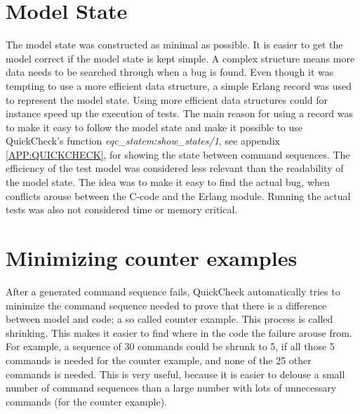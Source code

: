 \section{Model State}
The model state was constructed as minimal as possible. It is easier
to get the model correct if the model state is kept simple. A complex
structure means more data needs to be searched through when a bug is
found.  Even though it was tempting to use a more efficient data
structure, a simple Erlang record was used to represent the model
state. Using more efficient data structures could for instance speed
up the execution of tests. The main reason for using a record was to
make it easy to follow the model state and make it possible to use
QuickCheck's function \emph{eqc\_statem:show\_states/1}, see appendix
\ref{APP:QUICKCHECK}, for showing the state between command
sequences. The efficiency of the test model was considered less
relevant than the readability of the model state.  The idea was to
make it easy to find the actual bug, when conflicts arouse between the
C-code and the Erlang module. Running the actual tests was also not
considered time or memory critical.

\section{Minimizing counter examples}
After a generated command sequence fails, QuickCheck automatically
tries to minimize the command sequence needed to prove that there is a
difference between model and code; a so called counter example. This
process is called shrinking. This makes it easier to find where in the
code the failure arouse from. For example, a sequence of 30 commands
could be shrunk to 5, if all those 5 commands is needed for the
counter example, and none of the 25 other commands is needed. This is
very useful, because it is easier to delouse a small number of command
sequences than a large number with lots of unnecessary commands (for
the counter example).
